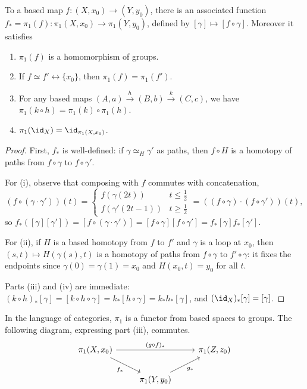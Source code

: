 \begin{proposition}[$\pi_1$ is a Functor] \label{prop:functor}
	To a based map $f: (X, x_0) \rightarrow (Y, y_0)$, there is an associated function
	$f_* = \pi_1(f): \pi_1(X, x_0) \rightarrow \pi_1(Y, y_0)$, defined by $[\gamma] \mapsto [f \circ \gamma]$. Moreover it satisfies
	\begin{enumerate}
		\item $\pi_1(f)$ is a homomorphism of groups.
		\item If $f \simeq f' \rel \{x_0\}$, then $\pi_1(f) = \pi_1(f')$.
		\item For any based maps $(A, a) \stackrel{h}{\longrightarrow}(B, b) \stackrel{k}{\longrightarrow}(C, c)$, we have $\pi_1(k \circ h)= \pi_1(k) \circ \pi_1(h)$.
		\item $\pi_1(\id_X) = \id_{\pi_1(X, x_0)}$.
	\end{enumerate}
\end{proposition}
\begin{proof}
	First, $f_*$ is well-defined: if $\gamma \simeq_H \gamma'$ as paths, then $f \circ H$ is a homotopy of paths from $f \circ \gamma$ to $f \circ \gamma'$.

	For (i), observe that composing with $f$ commutes with concatenation,
	$$
	(f \circ (\gamma \cdot \gamma'))(t) = \begin{cases} f(\gamma(2t)) & t \leq \tfrac12 \\ f(\gamma'(2t-1)) & t \geq \tfrac12\end{cases} = ((f\circ\gamma)\cdot(f\circ\gamma'))(t),
	$$
	so $f_*([\gamma][\gamma']) = [f \circ (\gamma\cdot\gamma')] = [f\circ\gamma][f\circ\gamma'] = f_*[\gamma] f_*[\gamma']$.

	For (ii), if $H$ is a based homotopy from $f$ to $f'$ and $\gamma$ is a loop at $x_0$, then $(s,t) \mapsto H(\gamma(s), t)$ is a homotopy of paths from $f \circ \gamma$ to $f' \circ \gamma$: it fixes the endpoints since $\gamma(0) = \gamma(1) = x_0$ and $H(x_0, t) = y_0$ for all $t$.

	Parts (iii) and (iv) are immediate: $(k \circ h)_*[\gamma] = [k \circ h \circ \gamma] = k_*[h \circ \gamma] = k_*h_*[\gamma]$, and $(\id_X)_*[\gamma] = [\gamma]$.
\end{proof}

In the language of categories, $\pi_1$ is a functor from based spaces to groups. The
following diagram, expressing part (iii), commutes.
\[\begin{tikzcd}
	{\pi_1(X,x_0)} \arrow[rr, "{(g \circ f)_*}"] \arrow[rd, "f_*"'] & & {\pi_1(Z,z_0)} \\
	& {\pi_1(Y,y_0)} \arrow[ru, "g_*"'] &
\end{tikzcd}\]

